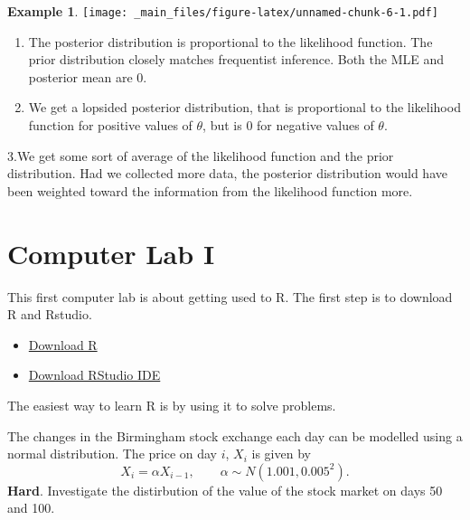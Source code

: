 \documentclass[
]{book}
\providecommand{\tightlist}{%
  \setlength{\itemsep}{0pt}\setlength{\parskip}{0pt}}
\theoremstyle{definition}
\theoremstyle{definition}
\newtheorem{example}{Example}[chapter]
\theoremstyle{definition}
\theoremstyle{definition}
\theoremstyle{remark}
\begin{document}
\begin{example}
\texttt{[image: \_main\_files/figure-latex/unnamed-chunk-6-1.pdf]}

\begin{enumerate}
\def\labelenumi{\arabic{enumi}.}
\item
  The posterior distribution is proportional to the likelihood function. The prior distribution closely matches frequentist inference. Both the MLE and posterior mean are 0.
\item
  We get a lopsided posterior distribution, that is proportional to the likelihood function for positive values of \(\theta\), but is 0 for negative values of \(\theta\).
\end{enumerate}

3.We get some sort of average of the likelihood function and the prior distribution. Had we collected more data, the posterior distribution would have been weighted toward the information from the likelihood function more.
\end{example}

\hypertarget{computer-lab-i}{%
\section{Computer Lab I}\label{computer-lab-i}}

This first computer lab is about getting used to R. The first step is to download R and Rstudio.

\begin{itemize}
\tightlist
\item
  \href{https://www.r-project.org}{Download R}
\item
  \href{https://posit.co/downloads/}{Download RStudio IDE}
\end{itemize}

The easiest way to learn R is by using it to solve problems.

The changes in the Birmingham stock exchange each day can be modelled using a normal distribution. The price on day \(i\), \(X_i\) is given by
\[
X_i = \alpha X_{i-1}, \qquad \alpha \sim N(1.001, 0.005^2).
\]
\textbf{Hard}. Investigate the distirbution of the value of the stock market on days 50 and 100.
\end{document}
